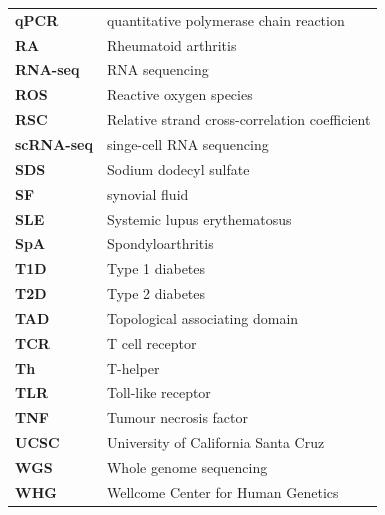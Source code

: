 \begin{longtable}{p{2.5cm}p{12.5cm}}
\textbf{qPCR} & quantitative polymerase chain reaction \\
\textbf{RA} & Rheumatoid arthritis \\
\textbf{RNA-seq} & RNA sequencing\\
\textbf{ROS}  & Reactive oxygen species \\
\textbf{RSC}  & Relative strand cross-correlation coefficient \\
\textbf{scRNA-seq} & singe-cell RNA sequencing \\
\textbf{SDS} & Sodium dodecyl sulfate \\
\textbf{SF} & synovial fluid \\
\textbf{SLE} & Systemic lupus erythematosus\\
\textbf{SpA} & Spondyloarthritis \\
\textbf{T1D} & Type 1 diabetes\\
\textbf{T2D} & Type 2 diabetes \\
\textbf{TAD} & Topological associating domain\\
\textbf{TCR} & T cell receptor\\
\textbf{Th} & T-helper \\
\textbf{TLR} & Toll-like receptor\\
\textbf{TNF} & Tumour necrosis factor\\
\textbf{UCSC} & University of California Santa Cruz\\
\textbf{WGS} & Whole genome sequencing\\
\textbf{WHG} & Wellcome Center for Human Genetics\\
\end{longtable}
